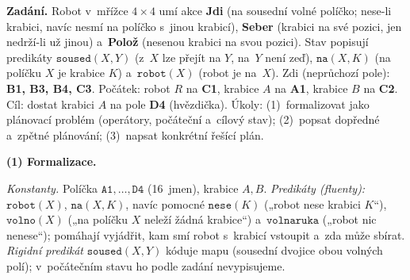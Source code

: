 \begin{priklad}
\par
\textbf{Zadání.} Robot v~mřížce $4\times4$ umí akce \textbf{Jdi} (na sousední volné políčko; nese-li krabici, navíc nesmí na políčko s~jinou krabicí), \textbf{Seber} (krabici na své pozici, jen nedrží-li už jinou) a~\textbf{Polož} (nesenou krabici na svou pozici). Stav popisují predikáty $\mathtt{soused}(X,Y)$ (z~$X$ lze přejít na $Y$, na~$Y$ není zeď), $\mathtt{na}(X,K)$ (na políčku $X$ je krabice $K$) a~$\mathtt{robot}(X)$ (robot je na~$X$). Zdi (neprůchozí pole): \textbf{B1, B3, B4, C3}. Počátek: robot $R$ na \textbf{C1}, krabice $A$ na \textbf{A1}, krabice $B$ na \textbf{C2}. Cíl: dostat krabici $A$ na pole \textbf{D4} (hvězdička). Úkoly: (1)~formalizovat jako plánovací problém (operátory, počáteční a~cílový stav); (2)~popsat dopředné a~zpětné plánování; (3)~napsat konkrétní řešící plán.

\medskip
\textbf{(1) Formalizace.}

\emph{Konstanty.} Políčka $\mathtt{A1},\dots,\mathtt{D4}$ (16~jmen), krabice $A,B$. \emph{Predikáty (fluenty):} $\mathtt{robot}(X)$, $\mathtt{na}(X,K)$, navíc pomocné $\mathtt{nese}(K)$ („robot nese krabici $K$``), $\mathtt{volno}(X)$ („na políčku $X$ neleží žádná krabice``) a~$\mathtt{volnaruka}$ („robot nic nenese``); pomáhají vyjádřit, kam smí robot s~krabicí vstoupit a~zda může sbírat. \emph{Rigidní predikát} $\mathtt{soused}(X,Y)$ kóduje mapu (sousední dvojice obou volných polí); v~počátečním stavu ho podle zadání nevypisujeme.


\end{priklad}
